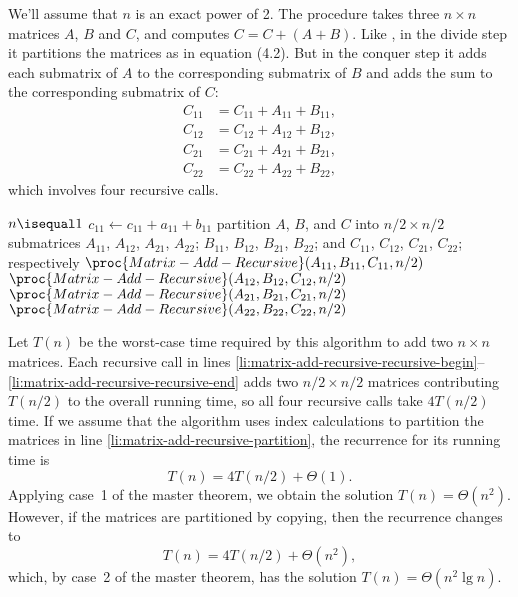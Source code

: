 We'll assume that $n$ is an exact power of 2.
The procedure  takes three $n\times n$ matrices $A$, $B$ and $C$, and computes $C=C+(A+B)$.
Like , in the divide step it partitions the matrices as in equation (4.2).
But in the conquer step it adds each submatrix of $A$ to the corresponding submatrix of $B$ and adds the sum to the corresponding submatrix of $C$:
\begin{align*}
    C_{11} &= C_{11}+A_{11}+B_{11}, \\
    C_{12} &= C_{12}+A_{12}+B_{12}, \\
    C_{21} &= C_{21}+A_{21}+B_{21}, \\
    C_{22} &= C_{22}+A_{22}+B_{22},
\end{align*}
which involves four recursive calls.

\begin{codebox}
\li \If $n\isequal1$
\li     \Then {}
\li         $c_{11}\gets c_{11}+a_{11}+b_{11}$
\li         \Return
        \End
\li {}
\li partition $A$, $B$, and $C$ into $n/2\times n/2$ submatrices
    \Indentmore
\zi     $A_{11}$, $A_{12}$, $A_{21}$, $A_{22}$; $B_{11}$, $B_{12}$, $B_{21}$, $B_{22}$;
\zi     and $C_{11}$, $C_{12}$, $C_{21}$, $C_{22}$; respectively
    \End \label{li:matrix-add-recursive-partition}
\li {}
\li $\proc{Matrix-Add-Recursive}(A_{11},B_{11},C_{11},n/2)$ \label{li:matrix-add-recursive-recursive-begin}
\li $\proc{Matrix-Add-Recursive}(A_{12},B_{12},C_{12},n/2)$
\li $\proc{Matrix-Add-Recursive}(A_{21},B_{21},C_{21},n/2)$
\li $\proc{Matrix-Add-Recursive}(A_{22},B_{22},C_{22},n/2)$ \label{li:matrix-add-recursive-recursive-end}
\end{codebox}

Let $T(n)$ be the worst-case time required by this algorithm to add two $n\times n$ matrices.
Each recursive call in lines \ref{li:matrix-add-recursive-recursive-begin}--\ref{li:matrix-add-recursive-recursive-end} adds two $n/2\times n/2$ matrices contributing $T(n/2)$ to the overall running time, so all four recursive calls take $4T(n/2)$ time.
If we assume that the algorithm uses index calculations to partition the matrices in line \ref{li:matrix-add-recursive-partition}, the recurrence for its running time is
\[
    T(n) = 4T(n/2)+\Theta(1).
\]
Applying case~1 of the master theorem, we obtain the solution $T(n)=\Theta(n^2)$.
However, if the matrices are partitioned by copying, then the recurrence changes to
\[
    T(n) = 4T(n/2)+\Theta(n^2),
\]
which, by case~2 of the master theorem, has the solution $T(n)=\Theta(n^2\lg n)$.
